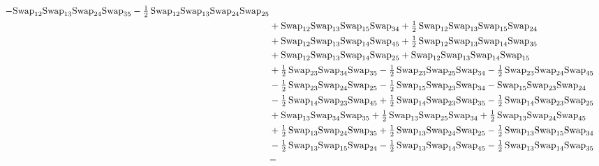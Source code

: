 \documentclass[12pt,dvipsnames,accepted=2016-08-18,a4paper,onecolumn]{quantumarticle}
\numberwithin{equation}{section}
\theoremstyle{definition}
\begin{document}
\begin{align*}
        -\textnormal{Swap}_{12} \textnormal{Swap}_{13} \textnormal{Swap}_{24} \textnormal{Swap}_{35} 
        - \tfrac12\,\textnormal{Swap}_{12} \textnormal{Swap}_{13} \textnormal{Swap}_{24} \textnormal{Swap}_{25} \\ &
        + \textnormal{Swap}_{12} \textnormal{Swap}_{13} \textnormal{Swap}_{15} \textnormal{Swap}_{34} 
        + \tfrac12\,\textnormal{Swap}_{12} \textnormal{Swap}_{13} \textnormal{Swap}_{15} \textnormal{Swap}_{24} \\ &
        + \textnormal{Swap}_{12} \textnormal{Swap}_{13} \textnormal{Swap}_{14} \textnormal{Swap}_{45} 
        + \tfrac12\,\textnormal{Swap}_{12} \textnormal{Swap}_{13} \textnormal{Swap}_{14} \textnormal{Swap}_{35}\\ & 
        +\textnormal{Swap}_{12} \textnormal{Swap}_{13} \textnormal{Swap}_{14} \textnormal{Swap}_{25} 
        + \textnormal{Swap}_{12} \textnormal{Swap}_{13} \textnormal{Swap}_{14} \textnormal{Swap}_{15} \\ &
        + \tfrac12\,\textnormal{Swap}_{23} \textnormal{Swap}_{34} \textnormal{Swap}_{35} - \tfrac12\,\textnormal{Swap}_{23} \textnormal{Swap}_{25} \textnormal{Swap}_{34} -
        \tfrac12\,\textnormal{Swap}_{23} \textnormal{Swap}_{24} \textnormal{Swap}_{45}\\ & - \tfrac12\,\textnormal{Swap}_{23} \textnormal{Swap}_{24} \textnormal{Swap}_{25} - \tfrac12\,\textnormal{Swap}_{15} \textnormal{Swap}_{23} \textnormal{Swap}_{34} - \textnormal{Swap}_{15} \textnormal{Swap}_{23} \textnormal{Swap}_{24}\\ & -
        \tfrac12\,\textnormal{Swap}_{14} \textnormal{Swap}_{23} \textnormal{Swap}_{45} + \tfrac12\,\textnormal{Swap}_{14} \textnormal{Swap}_{23} \textnormal{Swap}_{35} - \tfrac12\,\textnormal{Swap}_{14} \textnormal{Swap}_{23} \textnormal{Swap}_{25}\\ & + \textnormal{Swap}_{13} \textnormal{Swap}_{34} \textnormal{Swap}_{35} +
        \tfrac12\,\textnormal{Swap}_{13} \textnormal{Swap}_{25} \textnormal{Swap}_{34} + \tfrac12\,\textnormal{Swap}_{13} \textnormal{Swap}_{24} \textnormal{Swap}_{45}\\ & + \tfrac12\,\textnormal{Swap}_{13} \textnormal{Swap}_{24} \textnormal{Swap}_{35} + \tfrac12\,\textnormal{Swap}_{13} \textnormal{Swap}_{24} \textnormal{Swap}_{25} -
        \tfrac12\,\textnormal{Swap}_{13} \textnormal{Swap}_{15} \textnormal{Swap}_{34}\\ & - \tfrac12\,\textnormal{Swap}_{13} \textnormal{Swap}_{15} \textnormal{Swap}_{24} - \tfrac12\,\textnormal{Swap}_{13} \textnormal{Swap}_{14} \textnormal{Swap}_{45} - \tfrac12\,\textnormal{Swap}_{13} \textnormal{Swap}_{14} \textnormal{Swap}_{35}\\ & -

\end{align*}
\end{document}
